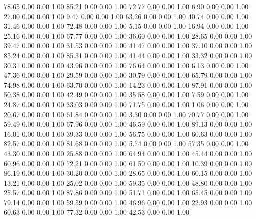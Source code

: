    78.65   0.00   0.00   1.00
   85.21   0.00   0.00   1.00
   72.77   0.00   0.00   1.00
    6.90   0.00   0.00   1.00
   27.00   0.00   0.00   1.00
    9.47   0.00   0.00   1.00
   63.26   0.00   0.00   1.00
   40.74   0.00   0.00   1.00
   31.46   0.00   0.00   1.00
   72.48   0.00   0.00   1.00
    5.15   0.00   0.00   1.00
   16.94   0.00   0.00   1.00
   25.16   0.00   0.00   1.00
   67.77   0.00   0.00   1.00
   36.60   0.00   0.00   1.00
   28.65   0.00   0.00   1.00
   39.47   0.00   0.00   1.00
   31.53   0.00   0.00   1.00
   41.47   0.00   0.00   1.00
   37.10   0.00   0.00   1.00
   85.24   0.00   0.00   1.00
   85.31   0.00   0.00   1.00
   41.44   0.00   0.00   1.00
   33.32   0.00   0.00   1.00
   30.31   0.00   0.00   1.00
   43.96   0.00   0.00   1.00
   76.64   0.00   0.00   1.00
    6.13   0.00   0.00   1.00
   47.36   0.00   0.00   1.00
   29.59   0.00   0.00   1.00
   30.79   0.00   0.00   1.00
   65.79   0.00   0.00   1.00
   74.98   0.00   0.00   1.00
   63.70   0.00   0.00   1.00
   14.23   0.00   0.00   1.00
   87.91   0.00   0.00   1.00
   50.38   0.00   0.00   1.00
   42.49   0.00   0.00   1.00
   35.58   0.00   0.00   1.00
    7.59   0.00   0.00   1.00
   24.87   0.00   0.00   1.00
   33.03   0.00   0.00   1.00
   71.75   0.00   0.00   1.00
    1.06   0.00   0.00   1.00
   20.67   0.00   0.00   1.00
   61.84   0.00   0.00   1.00
    3.30   0.00   0.00   1.00
   70.77   0.00   0.00   1.00
   59.49   0.00   0.00   1.00
   67.96   0.00   0.00   1.00
   46.59   0.00   0.00   1.00
   89.13   0.00   0.00   1.00
   16.01   0.00   0.00   1.00
   39.33   0.00   0.00   1.00
   56.75   0.00   0.00   1.00
   60.63   0.00   0.00   1.00
   82.57   0.00   0.00   1.00
   81.68   0.00   0.00   1.00
    5.74   0.00   0.00   1.00
   57.35   0.00   0.00   1.00
   43.30   0.00   0.00   1.00
   25.88   0.00   0.00   1.00
   64.94   0.00   0.00   1.00
   45.44   0.00   0.00   1.00
   60.96   0.00   0.00   1.00
   72.21   0.00   0.00   1.00
   61.50   0.00   0.00   1.00
   10.39   0.00   0.00   1.00
   86.19   0.00   0.00   1.00
   30.20   0.00   0.00   1.00
   28.65   0.00   0.00   1.00
   60.15   0.00   0.00   1.00
   13.21   0.00   0.00   1.00
   25.02   0.00   0.00   1.00
   59.35   0.00   0.00   1.00
   48.80   0.00   0.00   1.00
   25.57   0.00   0.00   1.00
   87.86   0.00   0.00   1.00
   51.71   0.00   0.00   1.00
   65.45   0.00   0.00   1.00
   79.14   0.00   0.00   1.00
   59.59   0.00   0.00   1.00
   46.96   0.00   0.00   1.00
   22.93   0.00   0.00   1.00
   60.63   0.00   0.00   1.00
   77.32   0.00   0.00   1.00
   42.53   0.00   0.00   1.00
